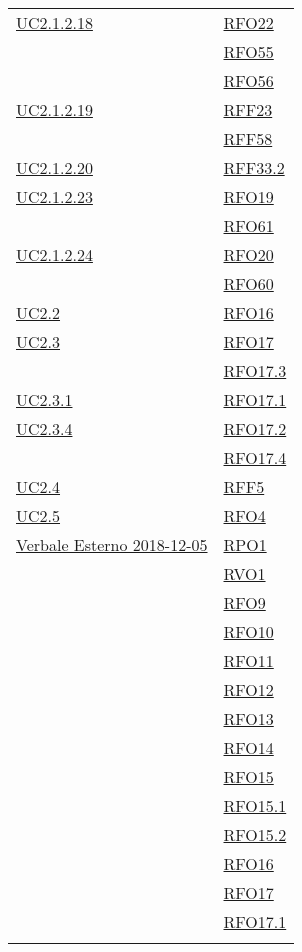 \begin{longtable}{|>{\centering}m{5cm}|m{5cm}<{\centering}|}
	\hyperref[UC2.1.2.18]{UC2.1.2.18} & \hyperlink{RFO22}{RFO22}\\
	& \hyperlink{RFO55}{RFO55}\\
	& \hyperlink{RFO56}{RFO56}\\ \hline
	\hyperref[UC2.1.2.19]{UC2.1.2.19} & \hyperlink{RFF23}{RFF23}\\
	& \hyperlink{RFF58}{RFF58}\\ \hline
	\hyperref[UC2.1.2.20]{UC2.1.2.20} & \hyperlink{RFF33.2}{RFF33.2}\\ \hline
	\hyperref[UC2.1.2.23]{UC2.1.2.23} & \hyperlink{RFO19}{RFO19}\\
	& \hyperlink{RFO61}{RFO61}\\ \hline
	\hyperref[UC2.1.2.24]{UC2.1.2.24} & \hyperlink{RFO20}{RFO20}\\
	& \hyperlink{RFO60}{RFO60}\\ \hline
	\hyperref[UC2.2]{UC2.2} & \hyperlink{RFO16}{RFO16}\\ \hline
	\hyperref[UC2.3]{UC2.3} & \hyperlink{RFO17}{RFO17}\\
	& \hyperlink{RFO17.3}{RFO17.3}\\ \hline
	\hyperref[UC2.3.1]{UC2.3.1} & \hyperlink{RFO17.1}{RFO17.1}\\ \hline
	\hyperref[UC2.3.4]{UC2.3.4} & \hyperlink{RFO17.2}{RFO17.2}\\
	& \hyperlink{RFO17.4}{RFO17.4}\\ \hline
	\hyperref[UC2.4]{UC2.4} & \hyperlink{RFF5}{RFF5}\\ \hline
	\hyperref[UC2.5]{UC2.5} & \hyperlink{RFO4}{RFO4}\\ \hline
	\hyperlink{Verbale Esterno 2018-12-05}{Verbale Esterno 2018-12-05} &
	\hyperlink{RPO1}{RPO1}\\ & \hyperlink{RVO1}{RVO1}\\ & \hyperlink{RFO9}{RFO9}\\ & \hyperlink{RFO10}{RFO10}\\ & \hyperlink{RFO11}{RFO11}\\ & \hyperlink{RFO12}{RFO12}\\ & \hyperlink{RFO13}{RFO13}\\ & \hyperlink{RFO14}{RFO14}\\ & \hyperlink{RFO15}{RFO15}\\ & \hyperlink{RFO15.1}{RFO15.1}\\ & \hyperlink{RFO15.2}{RFO15.2}\\ & \hyperlink{RFO16}{RFO16}\\ & \hyperlink{RFO17}{RFO17}\\ & \hyperlink{RFO17.1}{RFO17.1}\\ & 

\end{longtable}
